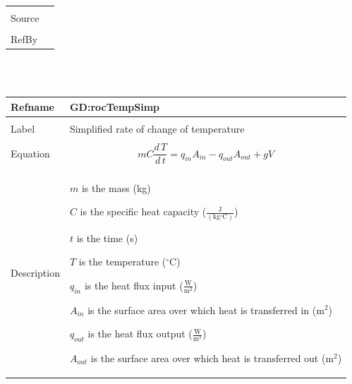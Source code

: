 \documentclass[12pt]{article}
\begin{document}
\begin{minipage}{\textwidth}
\begin{tabular}{p{} p{}}
                                                 \\ \midrule \\
                                                 Source & \cite{incroperaEtAl2007}
                                                          \\ \midrule \\
                                                          RefBy & 
\\ \bottomrule \end{tabular}
\end{minipage}\\
~\newline
 \noindent \begin{minipage}{\textwidth}
\begin{tabular}{p{} p{}}
\toprule \textbf{Refname} & \textbf{GD:rocTempSimp}
\label{GD:rocTempSimp}
\\ \midrule \\
Label & Simplified rate of change of temperature
        \\ \midrule \\
        Equation & \begin{dmath}
                   m C \frac{d\,T}{d\,t}={q_{in}} {A_{in}}-{q_{out}} {A_{out}}+g V
                   \end{dmath}
                   \\ \midrule \\
                   Description & \begin{symbDescription}
                                 \item{$m$ is the mass (kg)}
                                 \item{$C$ is the specific heat capacity ($\frac{\text{J}}{(\text{kg}{}^{\circ}\text{C})}$)}
                                 \item{$t$ is the time (s)}
                                 \item{$T$ is the temperature (${}^{\circ}$C)}
                                 \item{${q_{in}}$ is the heat flux input ($\frac{\text{W}}{\text{m}^{2}}$)}
                                 \item{${A_{in}}$ is the surface area over which heat is transferred in ($\text{m}^{2}$)}
                                 \item{${q_{out}}$ is the heat flux output ($\frac{\text{W}}{\text{m}^{2}}$)}
                                 \item{${A_{out}}$ is the surface area over which heat is transferred out ($\text{m}^{2}$)}

\end{symbDescription}
\end{tabular}
\end{minipage}
\end{document}
